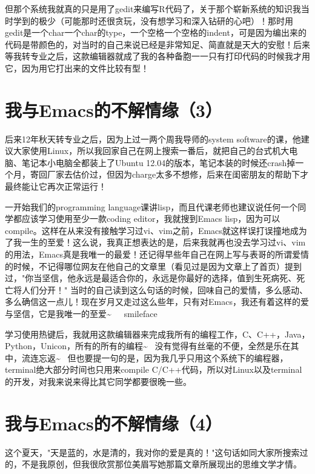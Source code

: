 \documentclass[12pt]{book}
\begin{document}
但那个系统我就真的只是用了gedit来编写R代码了，关于那个崭新系统的知识我当时学到的极少（可能那时还很贪玩，没有想学习和深入钻研的心吧）！那时用gedit是一个char一个char的type，一个空格一个空格的indent，可是因为编出来的代码是带颜色的，对当时的自己来说已经是非常知足、简直就是天大的安慰！后来等我转专业之后，这款编辑器就成了我的各种备胞一一只有打印代码的时候我才用它，因为用它打出来的文件比较有型！


\section{我与Emacs的不解情缘（3）}
\label{sec-6-3}

后来12年秋天转专业之后，因为上过一两个周我导师的system software的课，他建议大家使用Linux，所以我回家自己在网上搜索一番后，就把自己的台式机大电脑、笔记本小电脑全都装上了Ubuntu 12.04的版本，笔记本装的时候还crash掉一个月，寄回厂家去估价过，但因为charge太多不想修，后来在闺密朋友的帮助下才最终能让它再次正常运行！ 

一开始我们的programming language课讲lisp，而且代课老师也建议说任何一个同学都应该学习使用至少一款coding editor，我就搜到Emacs lisp，因为可以compile。这样在从来没有接触学习过vi、vim之前，Emacs就这样误打误撞地成为了我一生的至爱！这么说，我真正想表达的是，后来我就再也没去学习过vi、vim的用法，Emacs真是我唯一的最爱！还记得早些年自己在网上写与表哥的所谓爱情的时候，不记得哪位网友在他自己的文章里（看见过是因为文章上了首页）提到过，"你当坚信，他永远是最适合你的，永远是你最好的选择，值到生死病死、死亡将人们分开！" 当时的自己读到这么句话的时候，回味自己的爱情，多么感动、多么确信这一点儿！现在岁月又走过这么些年，只有对Emacs，我还有着这样的爱与坚信，它是我唯一的至爱\textasciitilde{}~　smileface

学习使用热键后，我就用这款编辑器来完成我所有的编程工作，C、C++，Java，Python，Unicon，所有的所有的编程\textasciitilde{}~ 没有觉得有丝毫的不便，全然是乐在其中，流连忘返\textasciitilde{}~ 但也要提一句的是，因为我几乎只用这个系统下的编程器，terminal绝大部分时间也只用来compile C/C++代码，所以对Linux以及terminal的开发，对我来说来得比其它同学都要很晚一些。


\section{我与Emacs的不解情缘（4）}
\label{sec-6-4}

这个夏天，"天是蓝的，水是清的，我对你的爱是真的！"这句话如同大家所搜索过的，不是我原创，但我很欣赏那位美眉写她那篇文章所展现出的思维文学才情。
\end{document}
